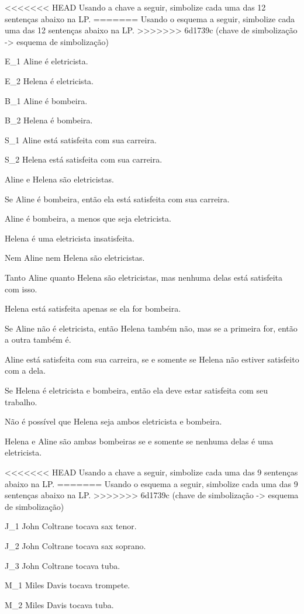 <<<<<<< HEAD
\problempart Usando a chave a seguir, simbolize cada uma das 12 sentenças abaixo na LP.\label{pr.avacareer}
=======
\problempart Usando o esquema a seguir, simbolize cada uma das 12 sentenças abaixo na LP.\label{pr.avacareer}
>>>>>>> 6d1739c (chave de simbolização -> esquema de simbolização)
	\begin{ekey}
		\item[E_1] Aline é eletricista.
		\item[E_2] Helena é eletricista.
		\item[B_1] Aline é bombeira.
		\item[B_2] Helena é bombeira.
		\item[S_1] Aline está satisfeita com sua carreira.
		\item[S_2] Helena está satisfeita com sua carreira.
	\end{ekey}
	\begin{earg}
		\item Aline e Helena são eletricistas.
		\item Se Aline é bombeira, então ela está satisfeita com sua carreira.
		\item Aline é bombeira, a menos que seja eletricista.
		\item Helena é uma eletricista insatisfeita.
		\item Nem Aline nem Helena são eletricistas.
		\item Tanto Aline quanto Helena são eletricistas, mas nenhuma delas está satisfeita com isso.
		\item Helena está satisfeita apenas se ela for bombeira.
		\item Se Aline não é eletricista, então Helena também não, mas se a primeira for, então a outra também é.
		\item Aline está satisfeita com sua carreira, se e somente se Helena não estiver satisfeito com a dela.
		\item Se Helena é eletricista e bombeira, então ela deve estar satisfeita com seu trabalho.
		\item Não é possível que Helena seja ambos eletricista e bombeira.
		\item Helena e Aline são ambas bombeiras se e somente se nenhuma delas é uma eletricista.
	\end{earg}

\problempart
<<<<<<< HEAD
Usando a chave a seguir, simbolize cada uma das 9 sentenças abaixo na LP.
=======
Usando o esquema a seguir, simbolize cada uma das 9 sentenças abaixo na LP.
>>>>>>> 6d1739c (chave de simbolização -> esquema de simbolização)
\label{pr.jazzinstruments}
\begin{ekey}
	\item[J_1] John Coltrane tocava sax tenor.
	\item[J_2] John Coltrane tocava sax soprano.
	\item[J_3] John Coltrane tocava tuba.
	\item[M_1] Miles Davis tocava trompete.
	\item[M_2] Miles Davis tocava tuba.
\end{ekey}

